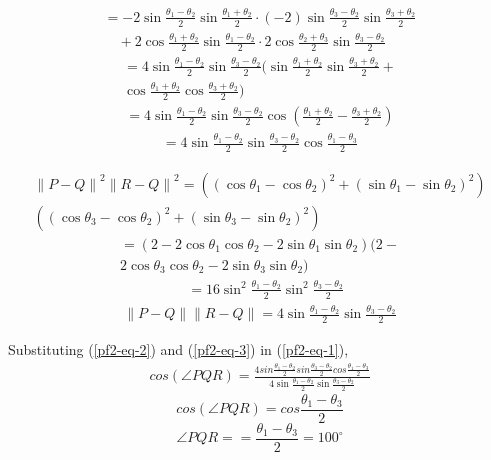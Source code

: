 \documentclass[journal,10pt,twocolumn]{article}
\providecommand{\norm}[1]{\left\lVert#1\right\rVert}
\begin{document}
{{\begin{multline*}
 = -2\sin\frac{\theta_1-\theta_2}2\sin\frac{\theta_1+\theta_2}2 \cdot(-2)\sin\frac{\theta_3-\theta_2}2\sin\frac{\theta_3+\theta_2}2 \\\quad+ 2\cos\frac{\theta_1+\theta_2}2\sin\frac{\theta_1-\theta_2}2 \cdot 2\cos\frac{\theta_2+\theta_3}2\sin\frac{\theta_3-\theta_2}2
\end{multline*}
\begin{multline*}
 = 4\sin\frac{\theta_1-\theta_2}2\sin\frac{\theta_3-\theta_2}2(\sin\frac{\theta_1+\theta_2}2\sin\frac{\theta_3+\theta_2}2+\\
 \cos\frac{\theta_1+\theta_2}2\cos\frac{\theta_3+\theta_2}2)
\end{multline*}
\begin{align*}
 = 4\sin\frac{\theta_1-\theta_2}2\sin\frac{\theta_3-\theta_2}2\cos\left(\frac{\theta_1+\theta_2}2-\frac{\theta_3+\theta_2}2\right)
\end{align*}
\begin{align}
 = 4\sin\frac{\theta_1-\theta_2}2\sin\frac{\theta_3-\theta_2}2\cos\frac{\theta_1-\theta_3}2
 \label{pf2-eq-2}
\end{align}

\begin{multline*}
 \norm{P-Q}^2\norm{R-Q}^2 = ((\cos\theta_1-\cos\theta_2)^2+(\sin\theta_1-\sin\theta_2)^2)\\
 ((\cos\theta_3-\cos\theta_2)^2+(\sin\theta_3-\sin\theta_2)^2)
\end{multline*}
\begin{multline*}
 = (2-2\cos\theta_1\cos\theta_2 - 2\sin\theta_1\sin\theta_2)(2-\\
 2\cos\theta_3\cos\theta_2 - 2\sin\theta_3\sin\theta_2)
\end{multline*}
\begin{align*}
 &= 16 \sin^2\frac{\theta_1-\theta_2}2\sin^2\frac{\theta_3-\theta_2}2
\end{align*}
\begin{align}
 \norm{P-Q}\norm{R-Q} = 4 \sin\frac{\theta_1-\theta_2}2\sin\frac{\theta_3-\theta_2}2
 \label{pf2-eq-3}
\end{align}

Substituting (\ref{pf2-eq-2}) and (\ref{pf2-eq-3}) in (\ref{pf2-eq-1}),
\begin{multline*}
 cos(\angle PQR) = \frac{4sin\frac{\theta_1-\theta_2}{2}sin\frac{\theta_3-\theta_2}{2}cos\frac{\theta_1-\theta_3}{2}}{4 \sin\frac{\theta_1-\theta_2}2\sin\frac{\theta_3-\theta_2}2}
\end{multline*}
\begin{equation}
cos(\angle PQR) = cos\frac{\theta_1-\theta_3}{2}
\label{pf2-eq-4}
\end{equation}
\begin{equation*}
\angle PQR = =\frac{\theta_1 - \theta_3 }{2}=100^\circ
\end{equation*}


}}
\end{document}
